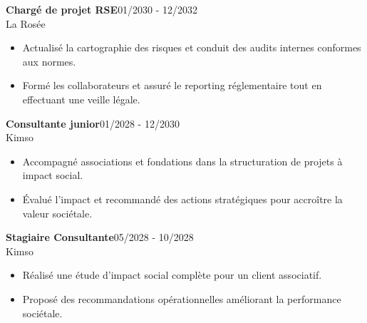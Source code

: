 \documentclass[a4paper]{article}
\renewcommand{\colorbox}[2]{#2}%
\begin{document}
\vspace{3mm}

\colorbox{maincolor}{%
  \begin{minipage}{\linewidth}
    \noindent
    \textbf{Chargé de projet RSE}\hfill 01/2030 - 12/2032\\
    La Rosée\\[-0.3em]
    \begin{itemize}[leftmargin=*]
      \item Actualisé la cartographie des risques et conduit des audits internes conformes aux normes. \item Formé les collaborateurs et assuré le reporting réglementaire tout en effectuant une veille légale.
    \end{itemize}
  \end{minipage}}

\vspace{3mm}

\colorbox{maincolor}{%
  \begin{minipage}{\linewidth}
    \noindent
    \textbf{Consultante junior}\hfill 01/2028 - 12/2030\\
    Kimso\\[-0.3em]
    \begin{itemize}[leftmargin=*]
      \item Accompagné associations et fondations dans la structuration de projets à impact social. \item Évalué l’impact et recommandé des actions stratégiques pour accroître la valeur sociétale.
    \end{itemize}
  \end{minipage}}

\vspace{3mm}

\colorbox{maincolor}{%
  \begin{minipage}{\linewidth}
    \noindent
    \textbf{Stagiaire Consultante}\hfill 05/2028 - 10/2028\\
    Kimso\\[-0.3em]
    \begin{itemize}[leftmargin=*]
      \item Réalisé une étude d’impact social complète pour un client associatif. \item Proposé des recommandations opérationnelles améliorant la performance sociétale.
    \end{itemize}
  \end{minipage}}

\vspace{3mm}
\end{document}
